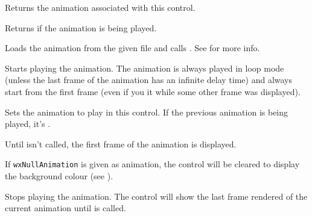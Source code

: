 Returns the animation associated with this control.


\label{wxanimationctrlisplaying}


Returns \true if the animation is being played.


\label{wxanimationctrlloadfile}


Loads the animation from the given file and calls .
See  for more info.


\label{wxanimationctrlplay}


Starts playing the animation.
The animation is always played in loop mode (unless the last frame of the animation
has an infinite delay time) and always start from the first frame
(even if you  it while some other frame was
displayed).


\label{wxanimationctrlsetanimation}


Sets the animation to play in this control.
If the previous animation is being played, it's .

Until  isn't called, the first frame
of the animation is displayed.

If {\tt wxNullAnimation} is given as animation, the control will be cleared to display
the background colour (see ).


\label{wxanimationctrlstop}


Stops playing the animation.
The control will show the last frame rendered of the current animation until
 is called.
